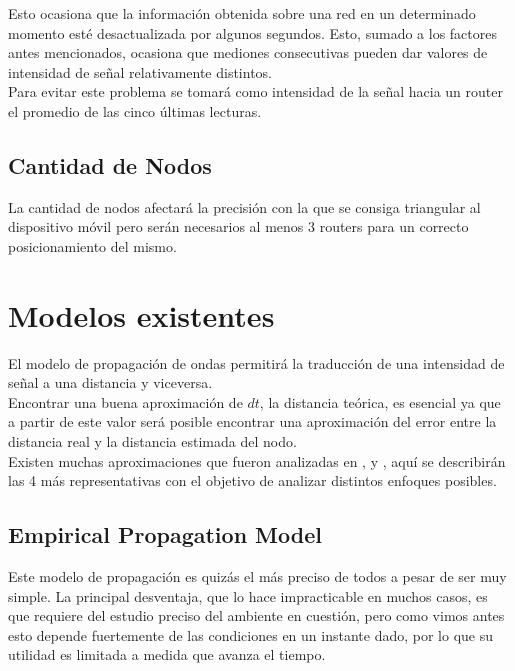 \documentclass[journal]{IEEEtran}
\begin{document}
Esto ocasiona que la información obtenida sobre una red en un determinado momento esté desactualizada por algunos segundos. Esto, sumado a los factores antes mencionados, ocasiona que mediones consecutivas pueden dar valores de intensidad de señal relativamente distintos.\\

Para evitar este problema se tomará como intensidad de la señal hacia un router el promedio de las cinco últimas lecturas.\\

\subsection{Cantidad de Nodos}

La cantidad de nodos afectará la precisión con la que se consiga triangular al dispositivo móvil pero serán necesarios al menos 3 routers para un correcto posicionamiento del mismo.\\

\section{Modelos existentes}

El modelo de propagación de ondas permitirá la traducción de una intensidad de señal a una distancia y viceversa.\\

Encontrar una buena aproximación de $dt$, la distancia teórica, es esencial ya que a partir de este valor será posible encontrar una aproximación del error entre la distancia real y la distancia estimada del nodo.\\

Existen muchas aproximaciones que fueron analizadas en \cite{low:cost:location:determination}, \cite{radar:tracking:system} y \cite{generic:model:signal:propagation}, aquí se describirán las 4 más representativas con el objetivo de analizar distintos enfoques posibles.\\

\subsection{Empirical Propagation Model}

Este modelo de propagación es quizás el más preciso de todos a pesar de ser muy simple. La principal desventaja, que lo hace impracticable en muchos casos, es que requiere del estudio preciso del ambiente en cuestión, pero como vimos antes esto depende fuertemente de las condiciones en un instante dado, por lo que su utilidad es limitada a medida que avanza el tiempo.\\
\end{document}
